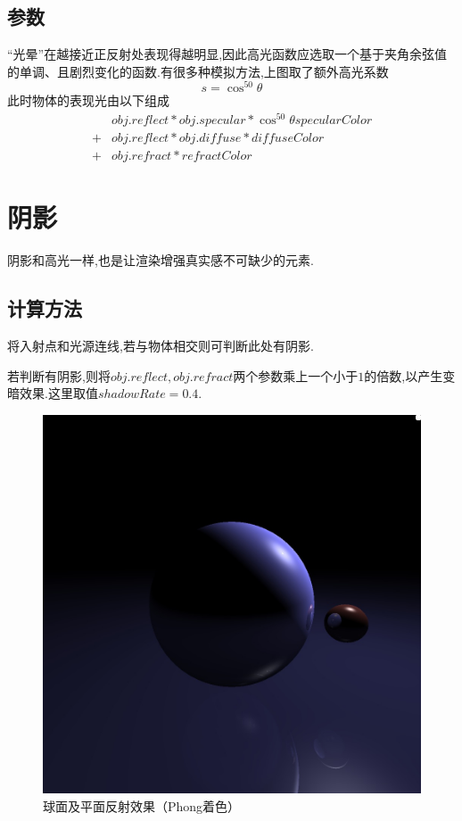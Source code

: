 \documentclass[10pt,twocolumn]{article}
\begin{document}
\subsection{\hei 参数}
“光晕”在越接近正反射处表现得越明显,因此高光函数应选取一个基于夹角余弦值的单调、且剧烈变化的函数.有很多种模拟方法,上图取了额外高光系数
\begin{equation}
s=\cos^{50}{\theta}
\end{equation}
此时物体的表现光由以下组成
\begin{align*}
 &obj.reflect * obj.specular *\cos^{50}{\theta}specularColor\\
 +&obj.reflect * obj.diffuse * diffuseColor\\
 +&obj.refract * refractColor
\end{align*}

\section{\hei 阴影}
阴影和高光一样,也是让渲染增强真实感不可缺少的元素.
\subsection{\hei 计算方法}
将入射点和光源连线,若与物体相交则可判断此处有阴影.

若判断有阴影,则将$obj.reflect,obj.refract$两个参数乘上一个小于$1$的倍数,以产生变暗效果.这里取值$shadowRate=0.4$.

\newpage
\begin{figure}[ht]
\centering
\includegraphics[scale=.2]{fig4.jpg}
\caption{球面及平面反射效果（Phong着色）}
\end{figure}
\end{document}
